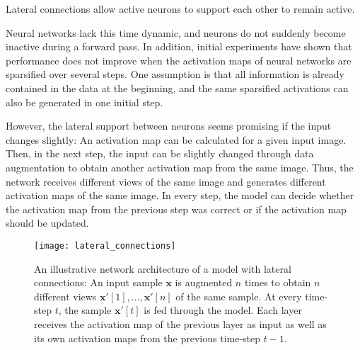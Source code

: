 \begin{claim}
	Lateral connections allow active neurons to support each other to remain active.
\end{claim}

Neural networks lack this time dynamic, and neurons do not suddenly become inactive during a forward pass. 
In addition, initial experiments have shown that performance does not improve when the activation maps of neural networks are sparsified over several steps.
One assumption is that all information is already contained in the data at the beginning, and the same sparsified activations can also be generated in one initial step.

However, the lateral support between neurons seems promising if the input changes slightly:
An activation map can be calculated for a given input image. Then, in the next step, the input can be slightly changed through data augmentation to obtain another activation map from the same image. Thus, the network receives different views of the same image and generates different activation maps of the same image. In every step, the model can decide whether the activation map from the previous step was correct or if the activation map should be updated.

\begin{figure}[h]
    \centering
    \texttt{[image: lateral\_connections]}
    \caption[Illustrative network architecture of a model with lateral connections]{An illustrative network architecture of a model with lateral connections: An input sample $\boldsymbol{x}$ is augmented $n$ times to obtain $n$ different views $\boldsymbol{x}'[1], ..., \boldsymbol{x}'[n]$ of the same sample. At every time-step $t$, the sample $\boldsymbol{x}'[t]$ is fed through the model. Each layer receives the activation map of the previous layer as input as well as its own activation maps from the previous time-step $t-1$.}
\end{figure}

